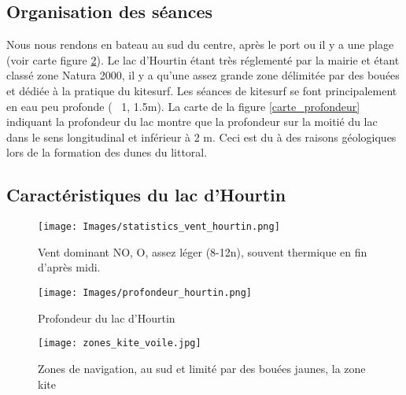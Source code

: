 \documentclass[11pt,a4paper]{report}
\begin{document}
\subsection{Organisation des séances}
Nous nous rendons en bateau au sud du centre, après le port ou il y a 
une plage (voir carte figure \ref{zones_nav}). Le lac d'Hourtin étant très 
réglementé par la mairie et étant classé zone Natura 2000\cite{natura2000}, 
il y a qu'une assez grande zone délimitée par des bouées et dédiée à la pratique
du kitesurf.
Les séances de kitesurf se font principalement en eau peu profonde (~ 1, 1.5m).
La carte de la figure \ref{carte_profondeur} indiquant la profondeur du lac
montre que la profondeur sur la moitié du lac dans le sens longitudinal 
et inférieur à 2 m. Ceci est du à des raisons géologiques lors de la
formation des dunes du littoral.

\subsection{Caractéristiques du lac d'Hourtin}
\begin{figure}
\centering
\texttt{[image: Images/statistics\_vent\_hourtin.png]} 
\caption{Vent dominant NO, O, assez léger (8-12n), 
souvent thermique en fin d'après midi.\label{vent_stats}}
\end{figure}

\begin{figure}
\begin{minipage}{0.4\textwidth}
\texttt{[image: Images/profondeur\_hourtin.png]} 
\caption{Profondeur du lac d'Hourtin\label{carte_profondeur}}
\end{minipage}
\hfill
\begin{minipage}{0.4\textwidth}
\texttt{[image: zones\_kite\_voile.jpg]} 
\caption{Zones de navigation, au sud et limité par des bouées jaunes,
 la zone kite\label{zones_nav}}
 \end{minipage}
\end{figure}
\end{document}
